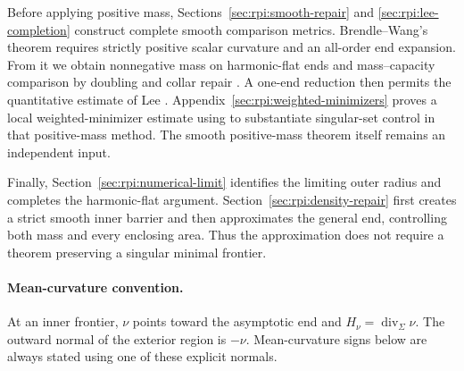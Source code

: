 Before applying positive mass, Sections~\ref{sec:rpi:smooth-repair} and
\ref{sec:rpi:lee-completion} construct complete smooth comparison metrics.
Brendle--Wang's theorem \cite[Corollary~1.6]{BrendleWang2026} requires
strictly positive scalar curvature and an all-order end expansion.
From it we obtain nonnegative mass on harmonic-flat ends and
mass--capacity comparison by doubling and collar repair \cite{Miao2002}.
A one-end reduction then permits the quantitative estimate of Lee
\cite{Lee2007NearEquality}. Appendix~\ref{sec:rpi:weighted-minimizers}
proves a local weighted-minimizer estimate using \cite{NaberValtorta2020}
to substantiate singular-set control in that positive-mass method.
The smooth positive-mass theorem itself remains an independent input.

Finally, Section~\ref{sec:rpi:numerical-limit} identifies the limiting
outer radius and completes the harmonic-flat argument.
Section~\ref{sec:rpi:density-repair} first creates a strict smooth inner
barrier and then approximates the general end, controlling both mass
and every enclosing area. Thus the approximation does not require a
theorem preserving a singular minimal frontier.

\paragraph{Mean-curvature convention.}
At an inner frontier, $\nu$ points toward the asymptotic end and
$H_\nu=\operatorname{div}_\Sigma\nu$. The outward normal of the exterior
region is $-\nu$. Mean-curvature signs below are always stated using
one of these explicit normals.
